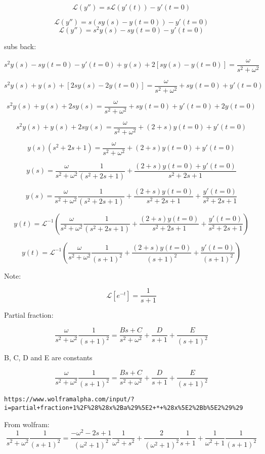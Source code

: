 \documentclass[17pt]{extarticle}
\begin{document}
$$\mathcal{L}(y'') = s \mathcal{L}(y'(t)) - y'(t=0)$$

$$\mathcal{L}(y'') = s (s y(s) - y(t=0)) - y'(t=0)$$
$$\mathcal{L}(y'') =  s^2 y(s) - sy(t=0) - y'(t=0)$$

subs back:

$$s^2 y(s) - sy(t=0) - y'(t=0)+ y(s) + 2[s y(s) - y(t=0)]= \frac{\omega}{s^2 + \omega^2}$$


$$s^2 y(s) + y(s) + [2s y(s) - 2y(t=0)]= \frac{\omega}{s^2 + \omega^2} + sy(t=0) + y'(t=0)$$

$$s^2 y(s) + y(s) + 2s y(s) = \frac{\omega}{s^2 + \omega^2} + sy(t=0) + y'(t=0) + 2y(t=0)$$

$$s^2 y(s) + y(s) + 2s y(s) = \frac{\omega}{s^2 + \omega^2} + (2+s) y(t=0) + y'(t=0) $$

$$y (s) (s^2 + 2s + 1)= \frac{\omega}{s^2 + \omega^2} + (2+s) y(t=0) + y'(t=0) $$

$$y (s)= \frac{\omega}{s^2 + \omega^2} \frac{1}{ (s^2 + 2s + 1)} +  \frac{(2+s) y(t=0) + y'(t=0)}{s^2 + 2s + 1} $$

$$y (s)= \frac{\omega}{s^2 + \omega^2} \frac{1}{ (s^2 + 2s + 1)} +  \frac{(2+s) y(t=0) }{s^2 + 2s + 1} + \frac{y'(t=0)}{s^2 + 2s + 1} $$


$$y(t)  = \mathcal{L}^{-1} (\frac{\omega}{s^2 + \omega^2} \frac{1}{ (s^2 + 2s + 1)} +  \frac{(2+s) y(t=0) }{s^2 + 2s + 1} + \frac{y'(t=0)}{s^2 + 2s + 1} )$$


$$y(t)  = \mathcal{L}^{-1} (\frac{\omega}{s^2 + \omega^2} \frac{1}{(s+1)^2} +  \frac{(2+s) y(t=0) }{(s+1)^2} + \frac{y'(t=0)}{(s+1)^2} )$$

Note:

$$\mathcal{L}[e^{-t}] = \frac{1}{s+1}$$

Partial fraction:

$$\frac{\omega}{s^2 + \omega^2} \frac{1}{(s+1)^2}  = \frac{Bs + C}{s^2 + \omega^2} + \frac{D}{s+1} + \frac{E}{(s+1)^2} $$

B, C, D and E are constants


$$\frac{\omega}{s^2 + \omega^2} \frac{1}{(s+1)^2}  = \frac{Bs + C}{s^2 + \omega^2} + \frac{D}{s+1} + \frac{E}{(s+1)^2} $$

\begin{verbatim}
https://www.wolframalpha.com/input/?i=partial+fraction+1%2F%28%28x%2Ba%29%5E2+*+%28x%5E2%2Bb%5E2%29%29
\end{verbatim}

From wolfram:
$$\frac{1}{s^2 + \omega^2} \frac{1}{(s+1)^2} = \frac{-\omega^2 - 2s +1}{(\omega^2+1)^2} \frac{1}{\omega^2 + s^2}+ \frac{2}{(\omega^2+1)^2} \frac{1}{s+1} + \frac{1}{\omega^2+1} \frac{1}{(s+1)^2}$$
\end{document}
